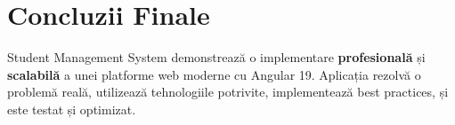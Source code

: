 \section{Concluzii Finale}

Student Management System demonstrează o implementare \textbf{profesională} și \textbf{scalabilă} a unei platforme web moderne cu Angular 19. Aplicația rezolvă o problemă reală, utilizează tehnologiile potrivite, implementează best practices, și este testat și optimizat.
